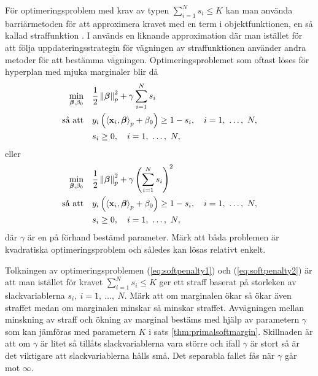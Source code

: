 \documentclass[a4paper, 12pt]{report}
\theoremstyle{definition}
\theoremstyle{remark}
\newcommand{\bfbeta}{{\boldsymbol{\beta}}}
\newcommand{\bfx}{\mathbf{x}}
\newcommand{\llangle}{\left\langle}
\newcommand{\rrangle}{\right\rangle}
\newcommand{\inner}[2]{\llangle #1, #2 \rrangle}
\begin{document}
För optimeringsproblem med krav av typen $\sum_{i=1}^{N}s_i\leq K$ kan man använda barriärmetoden för att approximera kravet med en term i objekt\-funktionen, en så kallad straffunktion \cite{Boyd}. I \cite{CortesVapnik} används en liknande approximation där man istället för att följa uppdateringsstrategin för vägningen av straffunktionen använder andra metoder för att bestämma vägningen. \mbox{Optimeringsproblemet} som oftast löses för hyperplan med mjuka marginaler blir då
\begin{equation}\label{eq:softpenalty1}
\begin{aligned}
	\operatornamewithlimits{min}_{\bfbeta, \beta_0} & & &\frac{1}{2}\left\|\bfbeta
\right\|_p^2 + \gamma\sum_{i=1}^{N} s_i\\
	\text{så att} & & &y_i\left(\inner{\bfx_i}{\bfbeta}_p+\beta_0\right)\geq 1 - s_i,\quad i=1,~\dots,~N,\\
	& & &s_i\geq0,\quad i=1,~\dots,~N,
\end{aligned}
\end{equation}
eller
\begin{equation}\label{eq:softpenalty2}
\begin{aligned}
\operatornamewithlimits{min}_{\bfbeta, \beta_0} & & &\frac{1}{2}\left\|\bfbeta
\right\|_p^2 + \gamma\left(\sum_{i=1}^{N} s_i\right)^2\\
\text{så att} & & &y_i\left(\inner{\bfx_i}{\bfbeta}_p+\beta_0\right)\geq 1 - s_i,\quad i=1,~\dots,~N,\\
& & &s_i\geq0,\quad i=1,~\dots,~N,
\end{aligned}
\end{equation}
där $\gamma$ är en på förhand bestämd parameter.
Märk att båda problemen är kvadratiska optimeringsproblem och således kan lösas relativt enkelt.

Tolkningen av optimeringsproblemen (\ref{eq:softpenalty1}) och (\ref{eq:softpenalty2}) är att man istället för kravet $\sum_{i=1}^{N}s_i\leq K$ ger ett straff baserat på storleken av slackvariablerna $s_i,~i=1,~\dots,~N$. Märk att om marginalen ökar så ökar även straffet medan om marginalen minskar så minskar straffet. Avvägningen mellan minskning av straff och ökning av marginal bestäms med hjälp av parametern $\gamma$ som kan jämföras med parametern $K$ i sats \ref{thm:primalsoftmargin}. Skillnaden är att om $\gamma$ är litet så tillåts slackvariablerna vara större och ifall $\gamma$ är stort så är det viktigare att slackvariablerna hålls små. Det separabla fallet fås när $\gamma$ går mot $\infty$.
\end{document}

